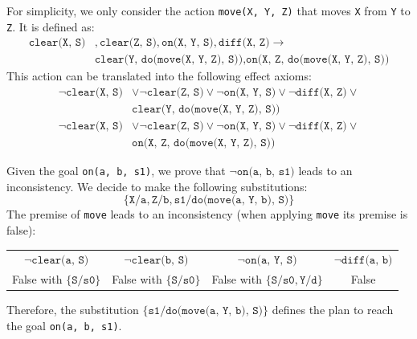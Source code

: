 \begin{example}
    For simplicity, we only consider the action \texttt{move(X, Y, Z)} that moves \texttt{X} from \texttt{Y} to \texttt{Z}.
    It is defined as:
    \[ 
        \begin{split}
            \texttt{clear(X, S)}&, \texttt{clear(Z, S)}, \texttt{on(X, Y, S)}, \texttt{diff(X, Z)} \rightarrow \\
            &\texttt{clear(Y, do(move(X, Y, Z), S))}, \texttt{on(X, Z, do(move(X, Y, Z), S))}
        \end{split}
    \]
    This action can be translated into the following effect axioms:
    \[ 
        \begin{split}
            \lnot\texttt{clear(X, S)} &\vee \lnot\texttt{clear(Z, S)} \vee \lnot\texttt{on(X, Y, S)} \vee \lnot\texttt{diff(X, Z)} \vee \\
            &\texttt{clear(Y, do(move(X, Y, Z), S))}
        \end{split}
    \]
    \[ 
        \begin{split}
            \lnot\texttt{clear(X, S)} &\vee \lnot\texttt{clear(Z, S)} \vee \lnot\texttt{on(X, Y, S)} \vee \lnot\texttt{diff(X, Z)} \vee \\
            &\texttt{on(X, Z, do(move(X, Y, Z), S))}
        \end{split}
    \]
\end{example}

Given the goal \texttt{on(a, b, s1)}, we prove that $\lnot\texttt{on(a, b, s1)}$ leads to an inconsistency.
We decide to make the following substitutions: 
\[ \{ \texttt{X}/\texttt{a}, \texttt{Z}/\texttt{b}, \texttt{s1}/\texttt{do(move(a, Y, b), S)} \} \]
The premise of \texttt{move} leads to an inconsistency (when applying \texttt{move} its premise is false):
\begin{center}
    \begin{tabular}{c|c|c|c}
        $\lnot\texttt{clear(a, S)}$ & $\lnot\texttt{clear(b, S)}$ & $\lnot\texttt{on(a, Y, S)}$ & $\lnot\texttt{diff(a, b)}$ \\
        False with $\{ \texttt{S}/\texttt{s0} \}$ & False with $\{ \texttt{S}/\texttt{s0} \}$ 
            & False with $\{ \texttt{S}/\texttt{s0}, \texttt{Y}/\texttt{d} \}$ & False
    \end{tabular}
\end{center}
Therefore, the substitution $\{ \texttt{s1}/\texttt{do(move(a, Y, b), S)} \}$ defines the plan to reach the goal \texttt{on(a, b, s1)}.


